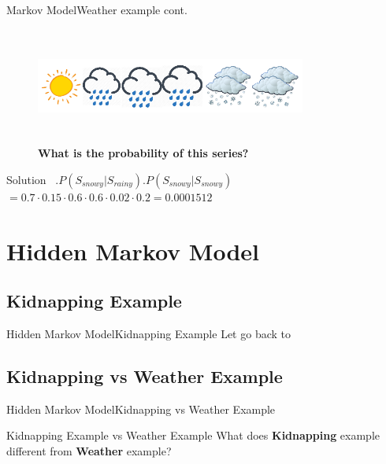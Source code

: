 \documentclass[10pt]{beamer}
\begin{document}
\begin{frame}[allowframebreaks]{Markov Model}{Weather example cont.}
\begin{figure}[h]
    \centering
    \includegraphics[width=3.5in,height=1.5in]{figures/weather_example_2.png}
    \caption {\textbf{What is the probability of this series?}}
  \end{figure}
   \begin{block}{Solution}
       \
       $.P(S_{snowy}|S_{rainy}).P(S_{snowy}|S_{snowy})$\\
       $=0.7\cdot0.15\cdot0.6\cdot0.6\cdot0.02\cdot0.2=0.0001512$
   \end{block}
\end{frame}

\section{Hidden Markov Model}
\subsection{Kidnapping Example}
\begin{frame}{Hidden Markov Model}{Kidnapping Example}
    Let go back to \hyperlink{kidnapping_example}{}
\end{frame}

\subsection{Kidnapping vs Weather Example}
\begin{frame}{Hidden Markov Model}{Kidnapping vs Weather Example}
   \begin{block}{Kidnapping Example vs Weather Example}
     What does \textbf{Kidnapping} example different from \textbf{Weather} example?
   \end{block}
\end{frame}
\end{document}
